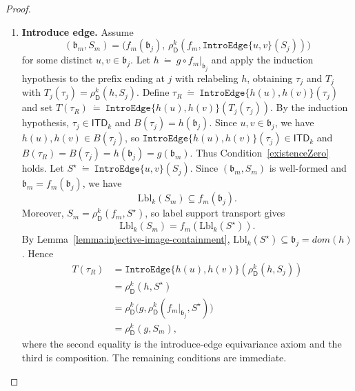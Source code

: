 \documentclass[10pt,a4paper]{amsart}
\newcommand{\abag}{\mathfrak{b}}
\newcommand{\abstractdecomposition}{\tau}
\newcommand{\action}{\rho}
\newcommand{\allabstractdecompositionstreewidth}[1]{\mathsf{ITD}_{#1}}
\newcommand{\defeq}{~\dot{=}~}
\newcommand{\domain}{dom}
\newcommand{\dpcore}{\mathsf{D}}
\newcommand{\dprefutation}{R}
\newcommand{\introedgegeneric}[2]{\mathtt{IntroEdge}\{#1,#2\}}
\newcommand{\relabelingfunction}{f}
\newcommand{\subtermToBag}{T}
\newcommand{\topbag}[1]{\topbagname(#1)}
\newcommand{\topbagname}{B}
\newcommand{\treewidthvalue}{k}
\newcommand{\vertexone}{u}
\newcommand{\vertextwo}{v}
\newcommand{\witnessset}{S}
\begin{document}
\begin{proof}
\begin{enumerate}
\item \textbf{Introduce edge.}
Assume
\[
(\abag_m,\witnessset_m)
=
\bigl(\relabelingfunction_m(\abag_j),\,\action_{\dpcore}^{\treewidthvalue}(\relabelingfunction_m,\introedgegeneric{\vertexone}{\vertextwo}(\witnessset_j))\bigr)
\]
for some distinct $\vertexone,\vertextwo\in \abag_j$.
Let $h\defeq g\circ \relabelingfunction_m|_{\abag_j}$ and apply the induction hypothesis to the prefix ending at $j$ with relabeling $h$, obtaining $\abstractdecomposition_j$ and $\subtermToBag_j$ with $\subtermToBag_j(\abstractdecomposition_j)=\action_{\dpcore}^{\treewidthvalue}(h,\witnessset_j)$.
Define $\abstractdecomposition_{\dprefutation}\defeq \introedgegeneric{h(\vertexone)}{h(\vertextwo)}(\abstractdecomposition_j)$ and set $\subtermToBag(\abstractdecomposition_{\dprefutation})\defeq \introedgegeneric{h(\vertexone)}{h(\vertextwo)}(\subtermToBag_j(\abstractdecomposition_j))$.
By the induction hypothesis, $\abstractdecomposition_j\in \allabstractdecompositionstreewidth{\treewidthvalue}$ and $\topbag{\abstractdecomposition_j}=h(\abag_j)$.
Since $\vertexone,\vertextwo\in \abag_j$, we have $h(\vertexone),h(\vertextwo)\in \topbag{\abstractdecomposition_j}$, so $\introedgegeneric{h(\vertexone)}{h(\vertextwo)}(\abstractdecomposition_j)\in \allabstractdecompositionstreewidth{\treewidthvalue}$ and $\topbag{\abstractdecomposition_{\dprefutation}}=\topbag{\abstractdecomposition_j}=h(\abag_j)=g(\abag_m)$.
Thus Condition~\ref{existenceZero} holds.
Let $S^\star\defeq \introedgegeneric{\vertexone}{\vertextwo}(\witnessset_j)$.
Since $(\abag_m,\witnessset_m)$ is well-formed and $\abag_m=\relabelingfunction_m(\abag_j)$, we have
\[
\mathrm{Lbl}_{\treewidthvalue}(\witnessset_m)\subseteq \relabelingfunction_m(\abag_j).
\]
Moreover, $\witnessset_m=\action_{\dpcore}^{\treewidthvalue}(\relabelingfunction_m,S^\star)$, so label support transport gives
\[
\mathrm{Lbl}_{\treewidthvalue}(\witnessset_m)=\relabelingfunction_m(\mathrm{Lbl}_{\treewidthvalue}(S^\star)).
\]
By Lemma~\ref{lemma:injective-image-containment}, $\mathrm{Lbl}_{\treewidthvalue}(S^\star)\subseteq \abag_j=\domain(h)$.
Hence
\[
\begin{aligned}
\subtermToBag(\abstractdecomposition_{\dprefutation})
&= \introedgegeneric{h(\vertexone)}{h(\vertextwo)}(\action_{\dpcore}^{\treewidthvalue}(h,\witnessset_j))\\
&= \action_{\dpcore}^{\treewidthvalue}(h,S^\star)\\
&= \action_{\dpcore}^{\treewidthvalue}\bigl(g,\action_{\dpcore}^{\treewidthvalue}(\relabelingfunction_m|_{\abag_j},S^\star)\bigr)\\
&= \action_{\dpcore}^{\treewidthvalue}(g,\witnessset_m),
\end{aligned}
\]
where the second equality is the introduce-edge equivariance axiom and the third is composition. The remaining conditions are immediate.


\end{enumerate}
\end{proof}
\end{document}
